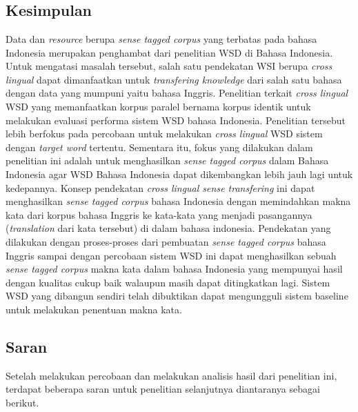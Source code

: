 \chapter{\babEnam}

\section{Kesimpulan}

Data dan \textit{resource} berupa \textit{sense tagged corpus} yang terbatas pada bahasa Indonesia merupakan penghambat dari penelitian WSD di Bahasa Indonesia. Untuk mengatasi masalah tersebut, salah satu pendekatan WSI berupa \textit{cross lingual} dapat dimanfaatkan untuk \textit{transfering knowledge} dari salah satu bahasa dengan data yang mumpuni yaitu bahasa Inggris. Penelitian \citep{septiantri2013wsd} terkait \textit{cross lingual} WSD yang memanfaatkan korpus paralel bernama korpus identik untuk melakukan evaluasi performa sistem WSD bahasa Indonesia. Penelitian tersebut lebih berfokus pada percobaan untuk melakukan \textit{cross lingual} WSD sistem dengan \textit{target word} tertentu. Sementara itu, fokus yang dilakukan dalam penelitian ini adalah untuk menghasilkan \textit{sense tagged corpus} dalam Bahasa Indonesia agar WSD Bahasa Indonesia dapat dikembangkan lebih jauh lagi untuk kedepannya. Konsep pendekatan \textit{cross lingual sense transfering} ini dapat menghasilkan \textit{sense tagged corpus} bahasa Indonesia dengan memindahkan makna kata dari korpus bahasa Inggris ke kata-kata yang menjadi pasangannya (\textit{translation} dari kata tersebut) di dalam bahasa indonesia. Pendekatan yang dilakukan dengan proses-proses dari pembuatan \textit{sense tagged corpus} bahasa Inggris sampai dengan percobaan sistem WSD ini dapat menghasilkan sebuah \textit{sense tagged corpus} makna kata dalam bahasa Indonesia yang mempunyai hasil dengan kualitas cukup baik walaupun masih dapat ditingkatkan lagi. Sistem WSD yang dibangun sendiri telah dibuktikan dapat mengungguli sistem baseline untuk melakukan penentuan makna kata.
\section{Saran}
Setelah melakukan percobaan dan melakukan analisis hasil dari penelitian ini, terdapat beberapa saran untuk penelitian selanjutnya diantaranya sebagai berikut.

